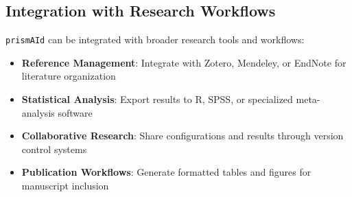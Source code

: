
\subsection{Integration with Research Workflows}

\texttt{prismAId} can be integrated with broader research tools and workflows:

\begin{itemize}
    \item \textbf{Reference Management}: Integrate with Zotero, Mendeley, or EndNote for literature organization
    \item \textbf{Statistical Analysis}: Export results to R, SPSS, or specialized meta-analysis software
    \item \textbf{Collaborative Research}: Share configurations and results through version control systems
    \item \textbf{Publication Workflows}: Generate formatted tables and figures for manuscript inclusion
\end{itemize}

